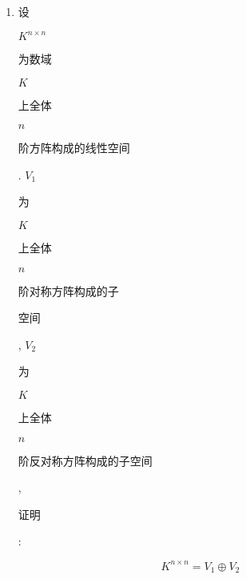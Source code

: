 \documentclass[10pt]{article}
\begin{document}
\begin{enumerate}
  \item \begin{CJK}{UTF8}{mj}设\end{CJK} $K^{n \times n}$ \begin{CJK}{UTF8}{mj}为数域\end{CJK} $K$ \begin{CJK}{UTF8}{mj}上全体\end{CJK} $n$ \begin{CJK}{UTF8}{mj}阶方阵构成的线性空间\end{CJK}. $V_{1}$ \begin{CJK}{UTF8}{mj}为\end{CJK} $K$ \begin{CJK}{UTF8}{mj}上全体\end{CJK} $n$ \begin{CJK}{UTF8}{mj}阶对称方阵构成的子\end{CJK} \begin{CJK}{UTF8}{mj}空间\end{CJK}, $V_{2}$ \begin{CJK}{UTF8}{mj}为\end{CJK} $K$ \begin{CJK}{UTF8}{mj}上全体\end{CJK} $n$ \begin{CJK}{UTF8}{mj}阶反对称方阵构成的子空间\end{CJK}, \begin{CJK}{UTF8}{mj}证明\end{CJK}:

\end{enumerate}
$$
K^{n \times n}=V_{1} \oplus V_{2}
$$
\end{document}
